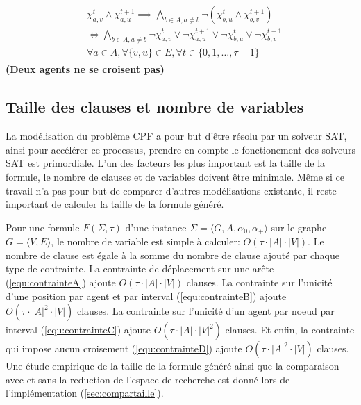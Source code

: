 \documentclass[french, 10pt, letterpaper]{article}
\theoremstyle{definition}
\theoremstyle{proposition}
\theoremstyle{example}
\begin{document}
\begin{itemize}
\begin{align}
                \label{equ:contrainteD}
                \begin{split}
                    &\chi_{a, v}^t \land \chi_{a, u}^{t+1} \implies \bigwedge_{b \in A, a \neq b} \lnot (\chi_{b, u}^t \land \chi_{b, v}^{t+1})
                    \\&\iff \bigwedge_{b \in A, a \neq b} \lnot \chi_{a, v}^t \lor \lnot \chi_{a, u}^{t+1} \lor \lnot \chi_{b, u}^t \lor \lnot \chi_{b, v}^{t+1}
                    \\&\forall a \in A, \forall \{v, u\} \in E, \forall t \in \{0, 1, \ldots, \tau-1\}
                \end{split}
            \end{align}
            \textbf{(Deux agents ne se croisent pas)}
    \end{itemize}

    \subsection{Taille des clauses et nombre de variables}
    \label{sec:tailleclause}

    La modélisation du problème CPF a pour but d'être résolu par un solveur SAT, ainsi pour accélérer ce processus, prendre en compte le fonctionement
    des solveurs SAT est primordiale. L'un des facteurs les plus important est la taille de la formule, le nombre de clauses et de variables doivent être minimale.
    Même si ce travail n'a pas pour but de comparer d'autres modélisations existante, il reste important de calculer la taille de la formule généré.

    Pour une formule $F(\Sigma, \tau)$ d'une instance $\Sigma=\langle G, A, \alpha_0, \alpha_+\rangle$ sur le graphe $G = \langle V, E \rangle$, 
    le nombre de variable est simple à calculer: $O(\tau \cdot |A| \cdot |V|)$. 
    Le nombre de clause est égale à la somme du nombre de clause ajouté par chaque type de contrainte.
    La contrainte de déplacement sur une arête (\ref{equ:contrainteA}) ajoute $O(\tau \cdot |A| \cdot |V|)$ clauses.
    La contrainte sur l'unicité d'une position par agent et par interval (\ref{equ:contrainteB}) ajoute $O(\tau \cdot |A|^2 \cdot |V|)$ clauses.
    La contrainte sur l'unicité d'un agent par noeud par interval (\ref{equ:contrainteC}) ajoute $O(\tau \cdot |A| \cdot |V|^2)$ clauses.
    Et enfin, la contrainte qui impose aucun croisement (\ref{equ:contrainteD}) ajoute $O(\tau \cdot |A|^2 \cdot |V|)$ clauses.
    Une étude empirique de la taille de la formule généré ainsi que la comparaison avec et sans la reduction de l'espace de recherche est donné lors
    de l'implémentation (\ref{sec:compartaille}).
\end{document}
